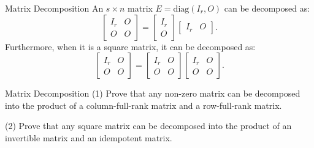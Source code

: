 \begin{lemma}{Matrix Decomposition}{}
  An $s \times n$ matrix $E = \mathrm{diag}(I_r, O)$ can be decomposed as:
  \begin{equation}
      \begin{bmatrix}I_r&O\\O&O\end{bmatrix}=\begin{bmatrix}I_r\\O\end{bmatrix}\begin{bmatrix}I_r&O\end{bmatrix}.
  \end{equation}
  Furthermore, when it is a square matrix, it can be decomposed as:
  \begin{equation}
      \begin{bmatrix}I_r&O\\O&O\end{bmatrix}=\begin{bmatrix}I_r&O\\O&O\end{bmatrix}\begin{bmatrix}I_r&O\\O&O\end{bmatrix}.
  \end{equation}
\end{lemma}

\begin{example}{Matrix Decomposition}{}
  (1) Prove that any non-zero matrix can be decomposed into the product of
  a column-full-rank matrix and a row-full-rank matrix.

  (2) Prove that any square matrix can be decomposed into the product of
  an invertible matrix and an idempotent matrix.
\end{example}

